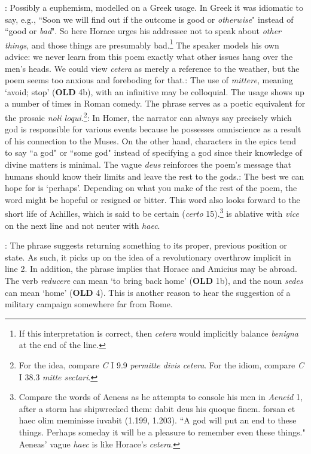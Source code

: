 : Possibly a euphemism, modelled on a Greek usage.  In Greek it was idiomatic to say, e.g.,  ``Soon we will find out if the outcome is good or \textit{otherwise}" instead of ``good or \textit{bad}".  So here Horace urges his addressee not to speak about \textit{other things}, and those things are presumably bad.\footnote{If this interpretation is correct, then \textit{cetera} would implicitly balance \textit{benigna} at the end of the line.}  The speaker models his own advice: we never learn from this poem exactly what other issues hang over the men's heads.  We could view \textit{cetera} as merely a reference to the weather, but the poem seems too anxious and foreboding for that.\indent{}: The use of \textit{mittere}, meaning `avoid; stop' (\textbf{OLD} 4b),  with an infinitive may be colloquial.  The usage shows up a number of times in Roman comedy.  The phrase serves as a poetic equivalent for the prosaic \textit{noli loqui}.\footnote{For the idea, compare \textit{C} I 9.9 \textit{permitte divis cetera}. For the idiom, compare \textit{C} I 38.3 \textit{mitte sectari}.}\indent{}: In Homer, the narrator can always say precisely which god is responsible for various events because he possesses omniscience as a result of his connection to the Muses.  On the other hand, characters in the epics tend to say ``a god" or ``some god" instead of specifying a god since their knowledge of divine matters is minimal.  The vague \textit{deus} reinforces the poem's message that humans should know their limits and leave the rest to the gods.\indent{}: The best we can hope for is `perhaps'.  Depending on what you make of the rest of the poem, the word might be hopeful or resigned or bitter.  This word also looks forward to the short life of Achilles, which is said to be certain (\textit{certo} 15).\footnote{Compare the words of Aeneas as he attempts to console his men in \textit{Aeneid} 1, after a storm has shipwrecked them: dabit deus his quoque finem. \lips forsan et haec olim meminisse iuvabit (1.199, 1.203).  ``A god will put an end to these things. \lips Perhaps someday it will be a pleasure to remember even these things."  Aeneas' vague \textit{haec} is like Horace's \textit{cetera}.}\indent{} is ablative with \textit{vice} on the next line and not neuter with \textit{haec}.


: The phrase suggests returning something to its proper, previous position or state.  As such, it picks up on the idea of a revolutionary overthrow implicit in line 2.  In addition, the phrase implies that Horace and Amicius may be abroad.  The verb \textit{reducere} can mean `to bring back home' (\textbf{OLD} 1b), and the noun \textit{sedes} can mean `home' (\textbf{OLD} 4).  This is another reason to hear the suggestion of a military campaign somewhere far from Rome.

